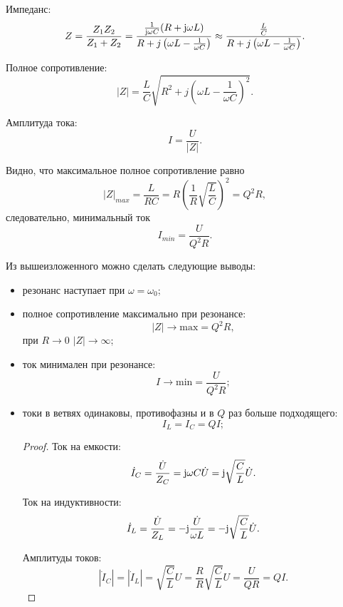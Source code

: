     Импеданс:
    \[
        Z =  \frac{Z_1Z_2}{Z_1 + Z_2} =
        \frac{\frac{1}{\mathrm{j}\omega C}(R + \mathrm{j}\omega L)}{R +
        j\left(\omega L - \frac{1}{\omega C}\right)} \approx
        \frac{\frac{L}{C}}{R + j\left(\omega L - \frac{1}{\omega C}\right)}.
    \]
    
    Полное сопротивление:
    \[
        |Z| = \frac{L}{C}{\sqrt{R^2 + j\left(\omega L -
        \frac{1}{\omega C}\right)^2}}.
    \]
    
    Амплитуда тока:
    \[
        I = \frac{U}{|Z|}.
    \]
    
    Видно, что максимальное полное сопротивление равно
    \[
        |Z|_{{max}} = \frac{L}{RC} =
        R\left(\frac{1}{R}\sqrt{\frac{L}{C}}\right)^2 = Q^2R,
    \]
    следовательно, минимальный ток
    \[
        I_{{min}} = \frac{U}{Q^2R}.
    \]
    
    Из вышеизложенного можно сделать следующие выводы:
    \begin{itemize}
        \item резонанс наступает при \( \omega = \omega_0 \);
        \item полное сопротивление максимально при резонансе:
            \[
                |Z| \to \mathrm{max} = Q^2R,
            \]
            при \( R \to 0 \) \( |Z| \to \infty \);
        \item ток минимален при резонансе:
            \[
                I \to \mathrm{min} = \frac{U}{Q^2R};
            \]
        \item токи в ветвях одинаковы, противофазны и в \( Q \) раз больше
            подходящего:
            \[
                I_L = I_C = QI;
            \]
        
            \begin{proof}
                Ток на емкости:
                \[
                    \dot{I}_C = \frac{\dot{U}}{Z_C} =
                    \mathrm{j}\omega C\dot{U} =
                    \mathrm{j}\sqrt{\frac{C}{L}}\dot{U}.
                \]
                
                Ток на индуктивности:
                \[
                    \dot{I}_L = \frac{\dot{U}}{Z_L} =
                    -\mathrm{j}\frac{\dot{U}}{\omega L} =
                    -\mathrm{j}\sqrt{\frac{C}{L}}\dot{U}.
                \]
                
                Амплитуды токов:
                \[
                    |\dot{I}_C| = |\dot{I}_L| = \sqrt{\frac{C}{L}}U =
                    \frac{R}{R}\sqrt{\frac{C}{L}}U = \frac{U}{QR} = QI.
                \]
            \end{proof}
    \end{itemize}
    
